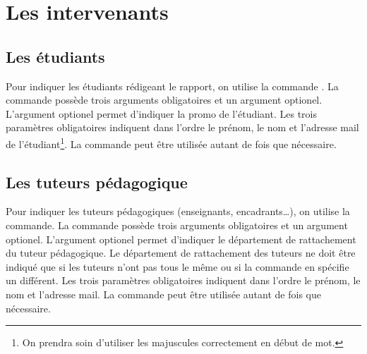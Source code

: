 \documentclass[overfullbox,hideweeklyreports,noseparatecontributorspage,nodate]{polytech/polytech}
\begin{document}
\section{Les intervenants}

\label{sec:intervenants}

\subsection{Les étudiants}

Pour indiquer les étudiants rédigeant le rapport, on utilise la commande \latexcode{\\student}. La commande possède trois arguments obligatoires et un argument optionel. L'argument optionel permet d'indiquer la promo de l'étudiant. Les trois paramètres obligatoires indiquent dans l'ordre le prénom, le nom et l'adresse mail de l'étudiant\footnote{On prendra soin d'utiliser les majuscules correctement en début de mot.}. La commande  \latexcode{\\student} peut être utilisée autant de fois que nécessaire.

\begin{latexsource}
\end{latexsource}

\subsection{Les tuteurs pédagogique}

Pour indiquer les tuteurs pédagogiques (enseignants, encadrants\ldots), on utilise la commande\linebreak \latexcode{\\academicsupervisor}. La commande possède trois arguments obligatoires et un argument optionel. L'argument optionel permet d'indiquer le département de rattachement du tuteur pédagogique. Le département de rattachement des tuteurs ne doit être indiqué que si les tuteurs n'ont pas tous le même ou si la commande \latexcode{\\schooldepartment} en spécifie un différent. Les trois paramètres obligatoires indiquent dans l'ordre le prénom, le nom et l'adresse mail. La commande \linebreak \latexcode{\\academicsupervisor} peut être utilisée autant de fois que nécessaire.
\end{document}
